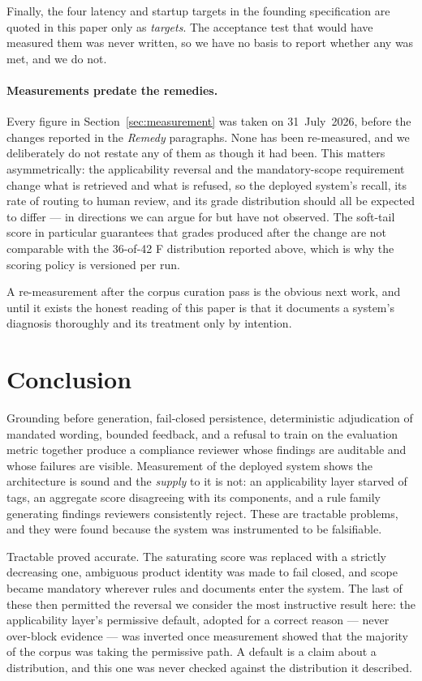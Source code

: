 \documentclass[10pt]{article}
\begin{document}
Finally, the four latency and startup targets in the founding specification are
quoted in this paper only as \emph{targets}. The acceptance test that would
have measured them was never written, so we have no basis to report whether any
was met, and we do not.

\paragraph{Measurements predate the remedies.} Every figure in
Section~\ref{sec:measurement} was taken on 31~July~2026, before the changes
reported in the \emph{Remedy} paragraphs. None has been re-measured, and we
deliberately do not restate any of them as though it had been. This matters
asymmetrically: the applicability reversal and the mandatory-scope requirement
change what is retrieved and what is refused, so the deployed system's recall,
its rate of routing to human review, and its grade distribution should all be
expected to differ --- in directions we can argue for but have not observed. The
soft-tail score in particular guarantees that grades produced after the change
are not comparable with the 36-of-42 F distribution reported above, which is why
the scoring policy is versioned per run.

A re-measurement after the corpus curation pass is the obvious next work, and
until it exists the honest reading of this paper is that it documents a system's
diagnosis thoroughly and its treatment only by intention.

\section{Conclusion}

Grounding before generation, fail-closed persistence, deterministic
adjudication of mandated wording, bounded feedback, and a refusal to
train on the evaluation metric together produce a compliance reviewer
whose findings are auditable and whose failures are visible. Measurement of the deployed system
shows the architecture is sound and the \emph{supply} to it is not: an
applicability layer starved of tags, an aggregate score disagreeing with its
components, and a rule family generating findings reviewers consistently
reject. These are tractable problems, and they were found because the system
was instrumented to be falsifiable.

Tractable proved accurate. The saturating score was replaced with a strictly
decreasing one, ambiguous product identity was made to fail closed, and scope
became mandatory wherever rules and documents enter the system. The last of
these then permitted the reversal we consider the most instructive result here:
the applicability layer's permissive default, adopted for a correct reason ---
never over-block evidence --- was inverted once measurement showed that the
majority of the corpus was taking the permissive path. A default is a claim
about a distribution, and this one was never checked against the distribution it
described.
\end{document}
